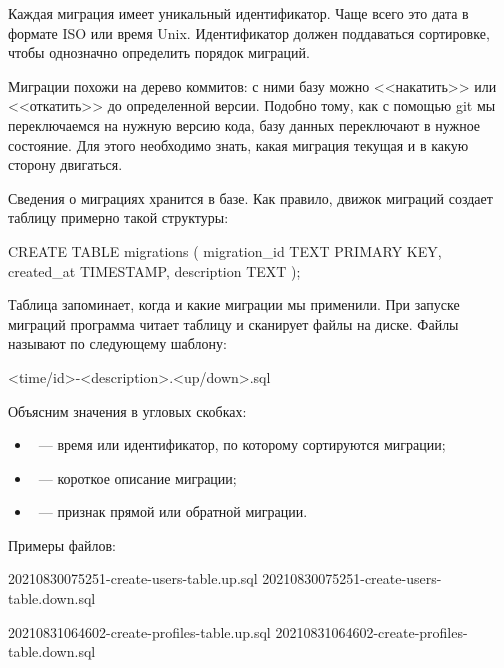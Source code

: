 Каждая миграция имеет уникальный идентификатор. Чаще всего это дата в формате ISO или время Unix. Идентификатор должен поддаваться сортировке, чтобы однозначно определить порядок миграций.

Миграции похожи на дерево коммитов: с ними базу можно <<накатить>> или <<откатить>> до определенной версии. Подобно тому, как с помощью git мы переключаемся на нужную версию кода, базу данных переключают в нужное состояние. Для этого необходимо знать, какая миграция текущая и в какую сторону двигаться.

Сведения о миграциях хранится в базе. Как правило, движок миграций создает таблицу  примерно такой структуры:

\begin{english}
  \begin{sql}
CREATE TABLE migrations (
  migration_id TEXT PRIMARY KEY,
  created_at TIMESTAMP,
  description TEXT
);
  \end{sql}
\end{english}

Таблица запоминает, когда и какие миграции мы применили. При запуске миграций программа читает таблицу и сканирует файлы на диске. Файлы называют по следующему шаблону:

\begin{english}
  \begin{text}
<time/id>-<description>.<up/down>.sql
  \end{text}
\end{english}

Объясним значения в угловых скобках:

\pagebreaklarge

\begin{itemize}

\item
  ~--- время или идентификатор, по которому сортируются миграции;

\item
  ~--- короткое описание миграции;

\item
  ~--- признак прямой или обратной миграции.

\end{itemize}

Примеры файлов:

\begin{english}
  \begin{text}
20210830075251-create-users-table.up.sql
20210830075251-create-users-table.down.sql

20210831064602-create-profiles-table.up.sql
20210831064602-create-profiles-table.down.sql
  \end{text}
\end{english}

